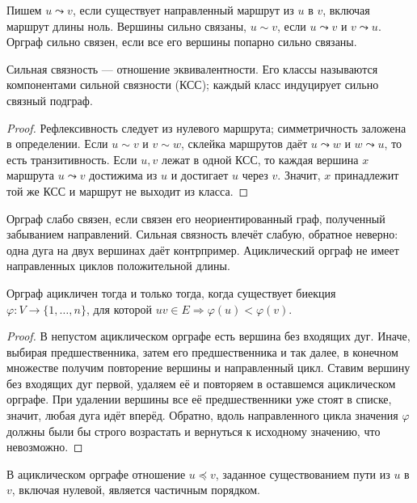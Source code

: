 \begin{definition}
Пишем \(u\leadsto v\), если существует направленный маршрут из \(u\)
в \(v\), включая маршрут длины ноль. Вершины сильно связаны,
\(u\sim v\), если \(u\leadsto v\) и \(v\leadsto u\).
Орграф сильно связен, если все его вершины попарно сильно связаны.
\end{definition}
\begin{theorem}
Сильная связность — отношение эквивалентности. Его классы называются
компонентами сильной связности (КСС); каждый класс индуцирует сильно связный подграф.
\end{theorem}
\begin{proof}
Рефлексивность следует из нулевого маршрута; симметричность заложена
в определении. Если \(u\sim v\) и \(v\sim w\), склейка маршрутов даёт
\(u\leadsto w\) и \(w\leadsto u\), то есть транзитивность.
Если \(u,v\) лежат в одной КСС, то каждая вершина \(x\) маршрута
\(u\leadsto v\) достижима из \(u\) и достигает \(u\) через \(v\).
Значит, \(x\) принадлежит той же КСС и маршрут не выходит из класса.
\end{proof}
\begin{definition}
Орграф слабо связен, если связен его неориентированный граф, полученный
забыванием направлений. Сильная связность влечёт слабую, обратное неверно:
одна дуга на двух вершинах даёт контрпример.
Ациклический орграф не имеет направленных циклов положительной длины.
\end{definition}
\begin{theorem}
Орграф ацикличен тогда и только тогда, когда существует биекция
\(\varphi:V\to\{1,\ldots,n\}\), для которой
\(uv\in E\Rightarrow\varphi(u)<\varphi(v)\).
\end{theorem}
\begin{proof}
В непустом ациклическом орграфе есть вершина без входящих дуг.
Иначе, выбирая предшественника, затем его предшественника и так далее,
в конечном множестве получим повторение вершины и направленный цикл.
Ставим вершину без входящих дуг первой, удаляем её и повторяем в оставшемся
ациклическом орграфе. При удалении вершины все её предшественники уже
стоят в списке, значит, любая дуга идёт вперёд.
Обратно, вдоль направленного цикла значения \(\varphi\) должны были бы
строго возрастать и вернуться к исходному значению, что невозможно.
\end{proof}
\begin{cor}
В ациклическом орграфе отношение \(u\preceq v\), заданное существованием
пути из \(u\) в \(v\), включая нулевой, является частичным порядком.
\end{cor}
